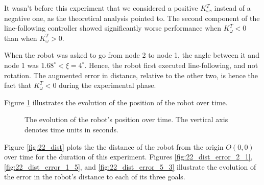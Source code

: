It wasn't before this experiment that we considered a
positive $K_{\omega}^T$, instead of a negative one, as the theoretical analysis
pointed to. The second component of the line-following controller showed
significantly worse performance when $K_{\omega}^T < 0$ than when $K_{\omega}^T > 0$.

When the robot was asked to go from node 2 to node 1, the angle between it and
node 1 was $1.68^{\circ} < \xi = 4^{\circ}$. Hence, the robot first executed
line-following, and not rotation. The augmented error in distance,
relative to the other two, is hence the fact that $K_{\omega}^T < 0$ during the
experimental phase.

Figure \ref{fig:22_map_7_xyt} illustrates the evolution of the position of the
robot over time.

\begin{figure}[H]\centering
  \scalebox{0.7}{}
  \caption{The evolution of the robot's position over time. The vertical axis
    denotes time units in seconds.}
  \label{fig:22_map_7_xyt}
\end{figure}

Figure \ref{fig:22_dist} plots the the distance of the robot from the origin
$O(0,0)$ over time for the duration of this experiment. Figures
\ref{fig:22_dist_error_2_1}, \ref{fig:22_dist_error_1_5}, and
\ref{fig:22_dist_error_5_3} illustrate the evolution of the error in the
robot's distance to each of its three goals.

